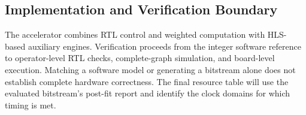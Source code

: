 \subsection{Implementation and Verification Boundary}
The accelerator combines RTL control and weighted computation with HLS-based
auxiliary engines. Verification proceeds from the integer software reference
to operator-level RTL checks, complete-graph simulation, and board-level
execution. Matching a software model or generating a bitstream alone does not
establish complete hardware correctness. The final resource table will use
the evaluated bitstream's post-fit report and identify the clock domains for
which timing is met.

